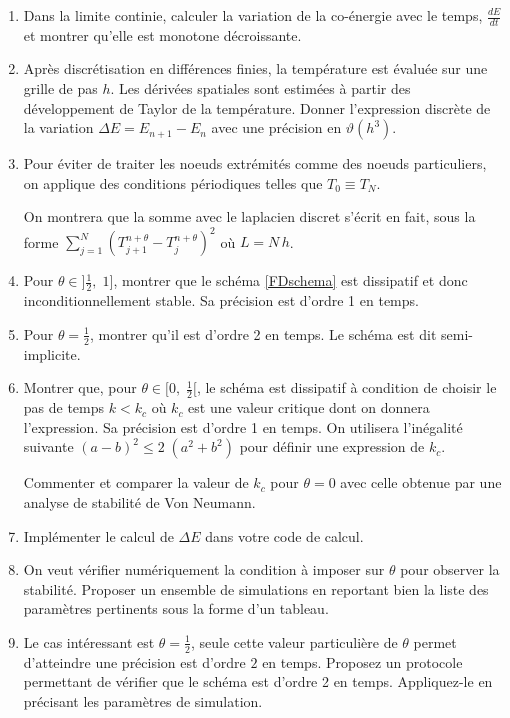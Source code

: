 \documentclass[a4paper, 12pt]{article}
\begin{document}
\begin{enumerate} 

\item Dans la limite continie, calculer la variation de la co-énergie avec le temps, $\frac{dE}{dt}$ et montrer qu'elle
est monotone décroissante.

\item Après discrétisation en différences finies, la température est évaluée sur une grille de pas $h$.
Les dérivées spatiales sont estimées à partir des développement de Taylor de la température.
Donner l'expression discrète de la variation $\Delta E = E_{n+1}-E_{n}$ avec une précision
en $\vartheta{(h^3)}$.

\item Pour éviter de traiter les noeuds extrémités comme des noeuds particuliers, on applique des conditions périodiques telles que $T_0 \equiv T_N$.

On montrera que la somme avec le laplacien discret s'écrit en fait, sous la forme 
$\sum_{j=1}^{N} (T_{j+1}^{n+\theta}-T_j^{n+\theta})^2$ où $L= N\, h$.

\item Pour $\theta \in ]\frac{1}{2}, \; 1]$, montrer que le schéma \eqref{FDschema} est dissipatif
 et donc inconditionnellement stable. Sa précision est d'ordre 1 en temps.
  
 \item Pour $\theta =\frac{1}{2}$, montrer qu'il est d'ordre 2 en temps. 
 Le schéma est dit semi-implicite.
 
\item Montrer que, pour $\theta \in [0,\;  \frac{1}{2}[$, le schéma est dissipatif à condition
de choisir le pas de temps $k<k_c$ où $k_c$ est une valeur critique dont on donnera
l'expression. Sa précision est d'ordre 1 en temps.
On utilisera l'inégalité suivante $(a-b)^2 \leq 2\; (a^2 + b^2)$ pour définir une expression de $k_c$.

Commenter et comparer la valeur de $k_c$ pour $\theta=0$ avec celle obtenue par une
analyse de stabilité de Von Neumann.

 \item  Implémenter le calcul de $\Delta E$ dans votre code de calcul.
 \item On veut vérifier numériquement la condition à imposer sur $\theta$
 pour observer la stabilité. Proposer un ensemble de simulations en reportant
 bien la liste des paramètres pertinents sous la forme d'un tableau.
 
 \item Le cas intéressant est $\theta = \frac{1}{2}$, 
seule cette valeur particulière de $\theta$ permet d'atteindre une précision est d'ordre $2$ en temps.
Proposez un protocole permettant de vérifier que le schéma est d'ordre 2 en temps.
 Appliquez-le en précisant les paramètres de simulation.

\end{enumerate}
\end{document}
